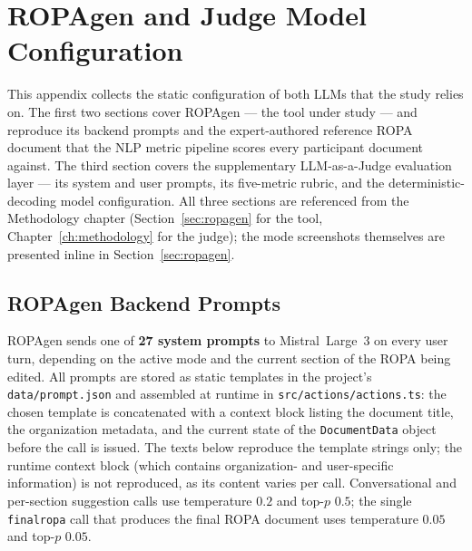 \chapter{ROPAgen and Judge Model Configuration}
\label{app:ropagen}

This appendix collects the static configuration of both LLMs that the study relies on. The first two sections cover ROPAgen --- the tool under study --- and reproduce its backend prompts and the expert-authored reference ROPA document that the NLP metric pipeline scores every participant document against. The third section covers the supplementary LLM-as-a-Judge evaluation layer --- its system and user prompts, its five-metric rubric, and the deterministic-decoding model configuration. All three sections are referenced from the Methodology chapter (Section~\ref{sec:ropagen} for the tool, Chapter~\ref{ch:methodology} for the judge); the mode screenshots themselves are presented inline in Section~\ref{sec:ropagen}.


\section{ROPAgen Backend Prompts}
\label{app:ropagen-prompts}

ROPAgen sends one of \textbf{27 system prompts} to Mistral~Large~3 on every user turn, depending on the active mode and the current section of the ROPA being edited. All prompts are stored as static templates in the project's \texttt{data/prompt.json} and assembled at runtime in \texttt{src/actions/actions.ts}: the chosen template is concatenated with a context block listing the document title, the organization metadata, and the current state of the \texttt{DocumentData} object before the call is issued. The texts below reproduce the template strings only; the runtime context block (which contains organization- and user-specific information) is not reproduced, as its content varies per call. Conversational and per-section suggestion calls use temperature $0.2$ and top-$p$ $0.5$; the single \texttt{finalropa} call that produces the final ROPA document uses temperature $0.05$ and top-$p$ $0.05$.


